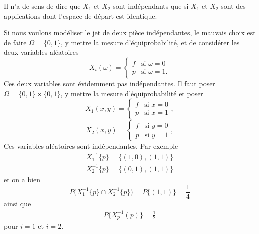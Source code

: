 \begin{remark}
     Il n'a de sens de dire que \( X_1\) et \( X_2\) sont indépendants que si \( X_1\) et \( X_2\) sont des applications dont l'espace de départ est identique.

     Si nous voulons modéliser le jet de deux pièce indépendantes, le mauvais choix est de faire \( \Omega=\{ 0,1 \}\), y mettre la mesure d'équiprobabilité, et de considérer les deux variables aléatoires
     \begin{equation}
         X_i(\omega)=\begin{cases}
             f   &   \text{si } \omega=0\\
             p   &    \text{si } \omega=1.
         \end{cases}
     \end{equation}
     Ces deux variables sont évidemment pas indépendantes. Il faut poser \( \Omega=\{ 0,1 \}\times \{ 0,1 \}\), y mettre la mesure d'équiprobabilité et poser
     \begin{equation}
         X_1(x,y)=\begin{cases}
             f   &   \text{si } x=0\\
             p   &    \text{si } x=1
         \end{cases},
     \end{equation}
     \begin{equation}
         X_2(x,y)=\begin{cases}
             f   &   \text{si } y=0\\
             p   &    \text{si } y=1
         \end{cases},
     \end{equation}
     Ces variables aléatoires sont indépendantes. Par exemple
     \begin{subequations}
         \begin{align}
             X_1^{-1}\{ p \}=\{ (1,0),(1,1) \}\\
             X_2^{-1}\{ p \}=\{ (0,1),(1,1) \}
         \end{align}
     \end{subequations}
     et on a bien
     \begin{equation}
         P\big( X_1^{-1}\{ p \}\cap X_2^{-1}\{ p \} \big)=P\{ (1,1) \}=\frac{1}{ 4 }
     \end{equation}
     ainsi que
     \begin{subequations}
         \begin{align}
             P\{ X_p^{-1}(p) \}=\frac{ 1 }{2}
         \end{align}
     \end{subequations}
     pour \( i=1\) et \( i=2\).
\end{remark}

